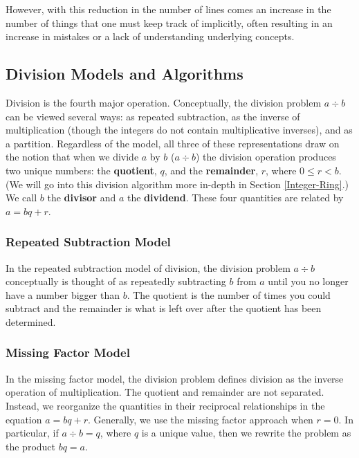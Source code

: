 \documentclass[
]{book}
\theoremstyle{definition}
\theoremstyle{definition}
\theoremstyle{definition}
\theoremstyle{definition}
\theoremstyle{remark}
\begin{document}
However, with this reduction in the number of lines comes an increase in the number of things that one must keep track of implicitly, often resulting in an increase in mistakes or a lack of understanding underlying concepts.

\hypertarget{division-models-and-algorithms}{%
\subsection{Division Models and Algorithms}\label{division-models-and-algorithms}}

Division is the fourth major operation. Conceptually, the division problem \(a \div b\) can be viewed several ways: as repeated subtraction, as the inverse of multiplication (though the integers do not contain multiplicative inverses), and as a partition. Regardless of the model, all three of these representations draw on the notion that when we divide \(a\) by \(b\) (\(a\div b\)) the division operation produces two unique numbers: the \textbf{quotient}, \(q\), and the \textbf{remainder}, \(r\), where \(0\leq r <b\). (We will go into this division algorithm more in-depth in Section \ref{Integer-Ring}.) We call \(b\) the \textbf{divisor} and \(a\) the \textbf{dividend}. These four quantities are related by \(a=bq+r\).

\hypertarget{repeated-subtraction-model}{%
\subsubsection*{Repeated Subtraction Model}\label{repeated-subtraction-model}}

In the repeated subtraction model of division, the division problem \(a\div b\) conceptually is thought of as repeatedly subtracting \(b\) from \(a\) until you no longer have a number bigger than \(b\). The quotient is the number of times you could subtract and the remainder is what is left over after the quotient has been determined.

\hypertarget{missing-factor-model}{%
\subsubsection*{Missing Factor Model}\label{missing-factor-model}}

In the missing factor model, the division problem defines division as the inverse operation of multiplication. The quotient and remainder are not separated. Instead, we reorganize the quantities in their reciprocal relationships in the equation \(a=bq+r\). Generally, we use the missing factor approach when \(r=0\). In particular, if \(a\div b = q\), where \(q\) is a unique value, then we rewrite the problem as the product \(bq=a\).
\end{document}
